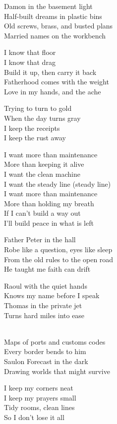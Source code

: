 \begin{lyrics}
Damon in the basement light\\
Half-built dreams in plastic bins\\
Old screws, brass, and busted plans\\
Married names on the workbench

I know that floor\\
I know that drag\\
Build it up, then carry it back\\
Fatherhood comes with the weight\\
Love in my hands, and the ache

Trying to turn to gold\\
When the day turns gray\\
I keep the receipts\\
I keep the rust away

I want more than maintenance\\
More than keeping it alive\\
I want the clean machine\\
I want the steady line
(steady line)\\
I want more than maintenance\\
More than holding my breath\\
If I can’t build a way out\\
I’ll build peace in what is left

Father Peter in the hall\\
Robe like a question, eyes like sleep\\
From the old rules to the open road\\
He taught me faith can drift

Raoul with the quiet hands\\
Knows my name before I speak\\
Thomas in the private jet\\
Turns hard miles into ease

\\
Maps of ports and customs codes\\
Every border bends to him\\
Saulon Forecast in the dark\\
Drawing worlds that might survive

I keep my corners neat\\
I keep my prayers small\\
Tidy rooms, clean lines\\
So I don’t lose it all


\end{lyrics}
